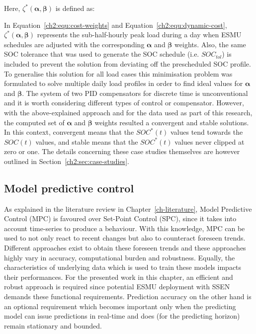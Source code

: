 

Here, $\zeta^*(\boldsymbol{\alpha}, \boldsymbol{\beta})$ is defined as:



In Equation~\ref{ch2:equ:cost-weights} and Equation~\ref{ch2:equ:dynamic-cost}, $\zeta^*(\boldsymbol{\alpha}, \boldsymbol{\beta})$ represents the sub-half-hourly peak load during a day when ESMU schedules are adjusted with the corresponding $\boldsymbol{\alpha}$ and $\boldsymbol{\beta}$ weights.
Also, the same SOC tolerance that was used to generate the SOC schedule (i.e. $SOC_{tol}$) is included to prevent the solution from deviating off the prescheduled SOC profile.
To generalise this solution for all load cases this minimisation problem was formulated to solve multiple daily load profiles in order to find ideal values for $\boldsymbol{\alpha}$ and $\boldsymbol{\beta}$.
The system of two PID compensators for discrete time is unconventional and it is worth considering different types of control or compensator.
However, with the above-explained approach and for the data used as part of this research, the computed set of $\boldsymbol{\alpha}$ and $\boldsymbol{\beta}$ weights resulted a convergent and stable solutions.
In this context, convergent means that the $SOC^*(t)$ values tend towards the $SOC(t)$ values, and stable means that the $SOC^*(t)$ values never clipped at zero or one.
The details concerning these case studies themselves are however outlined in Section~\ref{ch2:sec:case-studies}.

\subsection{Model predictive control}

As explained in the literature review in Chapter~\ref{ch-literature}, Model Predictive Control (MPC) is favoured over Set-Point Control (SPC), since it takes into account time-series to produce a behaviour.
With this knowledge, MPC can be used to not only react to recent changes but also to counteract foreseen trends.
Different approaches exist to obtain these foreseen trends and these approaches highly vary in accuracy, computational burden and robustness.
Equally, the characteristics of underlying data which is used to train these models impacts their performances.
For the presented work in this chapter, an efficient and robust approach is required since potential ESMU deployment with SSEN demands these functional requirements.
Prediction accuracy on the other hand is an optional requirement which becomes important only when the predicting model can issue predictions in real-time and does (for the predicting horizon) remain stationary and bounded.

